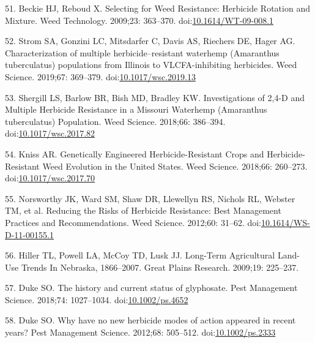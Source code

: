 \documentclass[10pt,letterpaper]{article}
\begin{document}
\leavevmode\hypertarget{ref-beckie_selecting_2009}{}%
51. Beckie HJ, Reboud X. Selecting for Weed Resistance: Herbicide
Rotation and Mixture. Weed Technology. 2009;23: 363--370.
doi:\href{https://doi.org/10.1614/WT-09-008.1}{10.1614/WT-09-008.1}

\leavevmode\hypertarget{ref-strom_characterization_2019}{}%
52. Strom SA, Gonzini LC, Mitsdarfer C, Davis AS, Riechers DE, Hager AG.
Characterization of multiple herbicide--resistant waterhemp (Amaranthus
tuberculatus) populations from Illinois to VLCFA-inhibiting herbicides.
Weed Science. 2019;67: 369--379.
doi:\href{https://doi.org/10.1017/wsc.2019.13}{10.1017/wsc.2019.13}

\leavevmode\hypertarget{ref-shergill_investigations_2018}{}%
53. Shergill LS, Barlow BR, Bish MD, Bradley KW. Investigations of 2,4-D
and Multiple Herbicide Resistance in a Missouri Waterhemp (Amaranthus
tuberculatus) Population. Weed Science. 2018;66: 386--394.
doi:\href{https://doi.org/10.1017/wsc.2017.82}{10.1017/wsc.2017.82}

\leavevmode\hypertarget{ref-kniss_genetically_2018}{}%
54. Kniss AR. Genetically Engineered Herbicide-Resistant Crops and
Herbicide-Resistant Weed Evolution in the United States. Weed Science.
2018;66: 260--273.
doi:\href{https://doi.org/10.1017/wsc.2017.70}{10.1017/wsc.2017.70}

\leavevmode\hypertarget{ref-norsworthy_reducing_2012}{}%
55. Norsworthy JK, Ward SM, Shaw DR, Llewellyn RS, Nichols RL, Webster
TM, et al. Reducing the Risks of Herbicide Resistance: Best Management
Practices and Recommendations. Weed Science. 2012;60: 31--62.
doi:\href{https://doi.org/10.1614/WS-D-11-00155.1}{10.1614/WS-D-11-00155.1}

\leavevmode\hypertarget{ref-hiller_long-term_2009}{}%
56. Hiller TL, Powell LA, McCoy TD, Lusk JJ. Long-Term Agricultural
Land-Use Trends In Nebraska, 1866--2007. Great Plains Research. 2009;19:
225--237.

\leavevmode\hypertarget{ref-duke_history_2018}{}%
57. Duke SO. The history and current status of glyphosate. Pest
Management Science. 2018;74: 1027--1034.
doi:\href{https://doi.org/10.1002/ps.4652}{10.1002/ps.4652}

\leavevmode\hypertarget{ref-duke_why_2012-1}{}%
58. Duke SO. Why have no new herbicide modes of action appeared in
recent years? Pest Management Science. 2012;68: 505--512.
doi:\href{https://doi.org/10.1002/ps.2333}{10.1002/ps.2333}

\nolinenumbers
\end{document}

